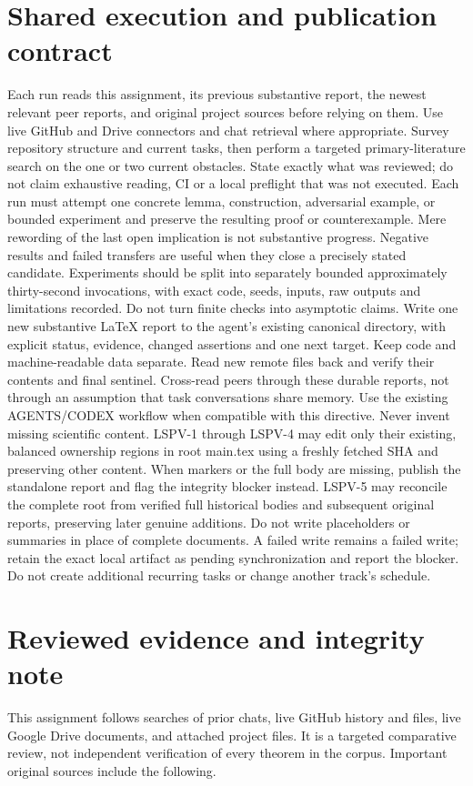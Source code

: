 \documentclass[11pt]{article}
\begin{document}
\section{Shared execution and publication contract}
Each run reads this assignment, its previous substantive report, the newest relevant peer reports, and original project sources before relying on them. Use live GitHub and Drive connectors and chat retrieval where appropriate. Survey repository structure and current tasks, then perform a targeted primary-literature search on the one or two current obstacles. State exactly what was reviewed; do not claim exhaustive reading, CI or a local preflight that was not executed.
Each run must attempt one concrete lemma, construction, adversarial example, or bounded experiment and preserve the resulting proof or counterexample. Mere rewording of the last open implication is not substantive progress. Negative results and failed transfers are useful when they close a precisely stated candidate. Experiments should be split into separately bounded approximately thirty-second invocations, with exact code, seeds, inputs, raw outputs and limitations recorded. Do not turn finite checks into asymptotic claims.
Write one new substantive LaTeX report to the agent's existing canonical directory, with explicit status, evidence, changed assertions and one next target. Keep code and machine-readable data separate. Read new remote files back and verify their contents and final sentinel. Cross-read peers through these durable reports, not through an assumption that task conversations share memory. Use the existing AGENTS/CODEX workflow when compatible with this directive. Never invent missing scientific content.
LSPV-1 through LSPV-4 may edit only their existing, balanced ownership regions in root main.tex using a freshly fetched SHA and preserving other content. When markers or the full body are missing, publish the standalone report and flag the integrity blocker instead. LSPV-5 may reconcile the complete root from verified full historical bodies and subsequent original reports, preserving later genuine additions. Do not write placeholders or summaries in place of complete documents. A failed write remains a failed write; retain the exact local artifact as pending synchronization and report the blocker. Do not create additional recurring tasks or change another track's schedule.

\section{Reviewed evidence and integrity note}
This assignment follows searches of prior chats, live GitHub history and files, live Google Drive documents, and attached project files. It is a targeted comparative review, not independent verification of every theorem in the corpus. Important original sources include the following.
\end{document}
